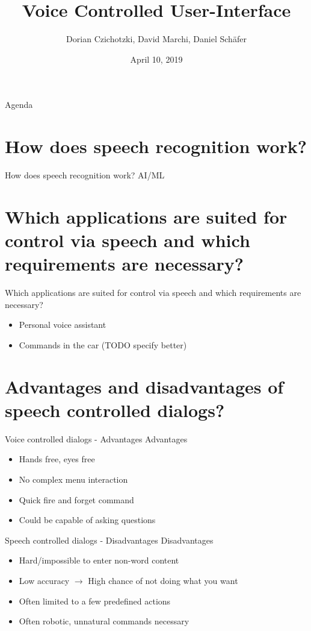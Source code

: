 \documentclass[
  10pt
, handout
]{beamer}
\title{Voice Controlled User-Interface}
\subtitle{}
\date{April 10, 2019}
\author{Dorian Czichotzki, David Marchi, Daniel Schäfer}
\begin{document}
\maketitle

\begin{frame}{Agenda}
  \tableofcontents[pausesections]
\end{frame}

\section{How does speech recognition work?}

\begin{frame}{How does speech recognition work?}
  AI/ML
\end{frame}

\section{Which applications are suited for control via speech and which requirements are necessary?}

\begin{frame}{Which applications are suited for control via speech and which requirements are necessary?}
  \begin{itemize}
    \item Personal voice assistant
    \item Commands in the car (TODO specify better)
  \end{itemize}
\end{frame}

\section{Advantages and disadvantages of speech controlled dialogs?}

\begin{frame}{Voice controlled dialogs - Advantages}
  Advantages

  \begin{itemize}
    \item Hands free, eyes free
    \item No complex menu interaction
    \item Quick fire and forget command
    \item Could be capable of asking questions
  \end{itemize}
\end{frame}

\begin{frame}{Speech controlled dialogs - Disadvantages}
  Disadvantages

  \begin{itemize}
    \item Hard/impossible to enter non-word content
    \item Low accuracy $\rightarrow$ High chance of not doing what you want
    \item Often limited to a few predefined actions
    \item Often robotic, unnatural commands necessary
  \end{itemize}
\end{frame}
\end{document}
